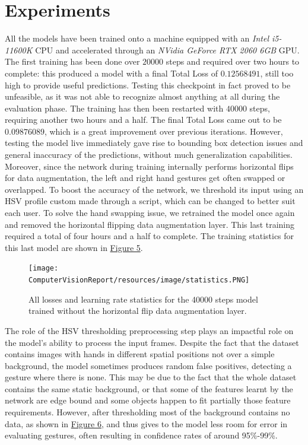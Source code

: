 \documentclass[a4paper, 12pt]{article}
\begin{document}
\section{Experiments}
\begin{flushleft}
All the models have been trained onto a machine equipped with an \textit{Intel i5-11600K} CPU and accelerated through an \textit{NVidia GeForce RTX 2060 6GB} GPU.
The first training has been done over $20000$ steps and required over two hours to complete: this produced a model with a final Total Loss of $0.12568491$, still too high to provide useful predictions. Testing this checkpoint in fact proved to be unfeasible, as it was not able to recognize almost anything at all during the evaluation phase.
The training has then been restarted with $40000$ steps, requiring another two hours and a half. The final Total Loss came out to be $0.09876089$, which is a great improvement over previous iterations. However, testing the model live immediately gave rise to bounding box detection issues and general inaccuracy of the predictions, without much generalization capabilities. Moreover, since the network during training internally performs horizontal flips for data augmentation, the left and right hand gestures get often swapped or overlapped. To boost the accuracy of the network, we threshold its input using an HSV profile custom made through a script, which can be changed to better suit each user.
To solve the hand swapping issue, we retrained the model once again and removed the horizontal flipping data augmentation layer. This last training required a total of four hours and a half to complete. 
The training statistics for this last model are shown in \hyperref[figure5]{Figure 5}.
\begin{figure}[!h]
    \centering
    \texttt{[image: ComputerVisionReport/resources/image/statistics.PNG]} \caption{All losses and learning rate statistics for the 40000 steps model trained without the horizontal flip data augmentation layer.}
\end{figure}
\label{figure5}
The role of the HSV thresholding preprocessing step plays an impactful role on the model's ability to process the input frames. Despite the fact that the dataset contains images with hands in different spatial positions not over a simple background, the model sometimes produces random false positives, detecting a gesture where there is none. This may be due to the fact that the whole dataset contains the same static background, or that some of the features learnt by the network are edge bound and some objects happen to fit partially those feature requirements. However, after thresholding most of the background contains no data, as shown in \hyperref[figure6]{Figure 6}, and thus gives to the model less room for error in evaluating gestures, often resulting in confidence rates of around 95\%-99\%.


\end{flushleft}
\end{document}
